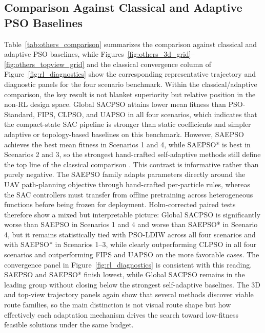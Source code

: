 \documentclass[final,5p,times]{elsarticle}
\begin{document}
\subsection{Comparison Against Classical and Adaptive PSO Baselines}
Table~\ref{tab:others_comparison} summarizes the comparison against classical and adaptive PSO baselines, while Figures~\ref{fig:others_3d_grid}--\ref{fig:others_topview_grid} and the classical convergence column of Figure~\ref{fig:rl_diagnostics} show the corresponding representative trajectory and diagnostic panels for the four scenario benchmark.
Within the classical/adaptive comparison, the key result is not blanket superiority but relative position in the non-RL design space. Global SACPSO attains lower mean fitness than PSO-Standard, FIPS, CLPSO, and UAPSO in all four scenarios, which indicates that the compact-state SAC pipeline is stronger than static coefficients and simpler adaptive or topology-based baselines on this benchmark. However, SAEPSO achieves the best mean fitness in Scenarios 1 and 4, while SAEPSO* is best in Scenarios 2 and 3, so the strongest hand-crafted self-adaptive methods still define the top line of the classical comparison \cite{Liu2025A}.
This contrast is informative rather than purely negative. The SAEPSO family adapts parameters directly around the UAV path-planning objective through hand-crafted per-particle rules, whereas the SAC controllers must transfer from offline pretraining across heterogeneous functions before being frozen for deployment. Holm-corrected paired tests therefore show a mixed but interpretable picture: Global SACPSO is significantly worse than SAEPSO in Scenarios 1 and 4 and worse than SAEPSO* in Scenario 4, but it remains statistically tied with PSO-LDIW across all four scenarios and with SAEPSO* in Scenarios 1--3, while clearly outperforming CLPSO in all four scenarios and outperforming FIPS and UAPSO on the more favorable cases.
The convergence panel in Figure~\ref{fig:rl_diagnostics} is consistent with this reading. SAEPSO and SAEPSO* finish lowest, while Global SACPSO remains in the leading group without closing below the strongest self-adaptive baselines. The 3D and top-view trajectory panels again show that several methods discover viable route families, so the main distinction is not visual route shape but how effectively each adaptation mechanism drives the search toward low-fitness feasible solutions under the same budget.
\end{document}
